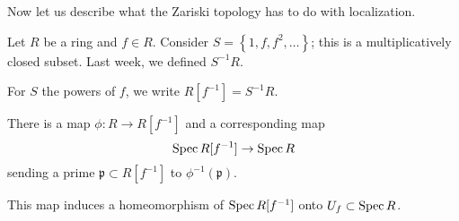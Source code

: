 Now let us describe what the Zariski topology has to do with
localization.

\begin{example} 
Let $R$ be a ring and $f \in R$. Consider $S = \left\{1, f, f^2,
\dots
\right\}$; this is a multiplicatively closed subset. Last week,
we defined
$S^{-1}R$.
\end{example}

\begin{definition} 
For $S$ the powers of $f$, we write $R[f^{-1}]=S^{-1}R$. 
\end{definition} 

There is  a map $\phi: R \to R[f^{-1}]$ and a corresponding map
\[ \operatorname{Spec} R[f^{-1}] \to \operatorname{Spec} R  \]
sending a prime $\mathfrak{p} \subset R[f^{-1}]$ to
$\phi^{-1}(\mathfrak{p})$.

\begin{proposition} 
This map induces a homeomorphism of $\operatorname{Spec} R[f^{-1}]$ onto $U_f
\subset \operatorname{Spec}
R$. 
\end{proposition} 
